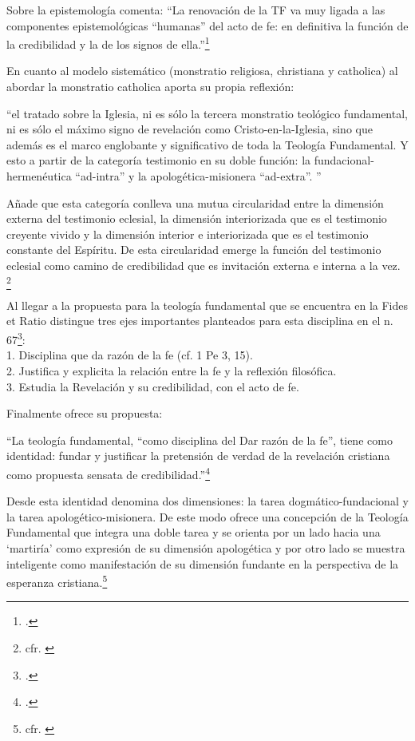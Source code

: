 \documentclass[12pt]{article}
\begin{document}
{Sobre la epistemología comenta:
``La renovación de la TF va muy ligada a las componentes epistemológicas ``humanas'' del acto de fe: en definitiva la función de la credibilidad y la de los signos de ella.''\footcite[p.~31]{ninotTF}

En cuanto al modelo sistemático (monstratio religiosa, christiana y catholica) al abordar la monstratio catholica aporta su propia reflexión:

``el tratado sobre la Iglesia, ni es sólo la tercera monstratio teológico fundamental, ni es sólo el máximo signo de revelación como Cristo-en-la-Iglesia, sino que además es el marco englobante y significativo de toda la Teología Fundamental. Y esto a partir de la categoría testimonio en su doble función: la fundacional-hermenéutica ``ad-intra'' y la apologética-misionera ``ad-extra''. ''

Añade que esta categoría conlleva una mutua circularidad entre la dimensión externa del testimonio eclesial, la dimensión interiorizada que es el testimonio creyente vivido y la dimensión interior e interiorizada que es el testimonio constante del Espíritu. De esta circularidad emerge la función del testimonio eclesial como camino de credibilidad que es invitación externa e interna a la vez. \footnote{cfr. \cite[p.~40]{ninotTF}}

Al llegar a la propuesta para la teología fundamental que se encuentra en la Fides et Ratio distingue tres ejes importantes planteados para esta disciplina en el n. 67\footcite[p.~49]{ninotTF}:\\1. Disciplina que da razón de la fe (cf. 1 Pe 3, 15).\\
2. Justifica y explicita la relación entre la fe y la reflexión filosófica.\\
3. Estudia la Revelación y su credibilidad, con el acto de fe.

Finalmente ofrece su propuesta:

``La teología fundamental, ``como disciplina del Dar razón de la fe'', tiene como identidad: fundar y justificar la pretensión de verdad de la revelación cristiana como propuesta sensata de credibilidad.''\footcite[p.~72]{ninotTF}

Desde esta identidad denomina dos dimensiones: la tarea dogmático-fundacional y la tarea apologético-misionera. De este modo ofrece una concepción de la Teología Fundamental que integra una doble tarea y se orienta por un lado hacia una `martiría' como expresión de su dimensión apologética y por otro lado se muestra inteligente como manifestación de su dimensión fundante en la perspectiva de la esperanza cristiana.\footnote{cfr. \cite[p.~72]{ninotTF}}

}
\end{document}
